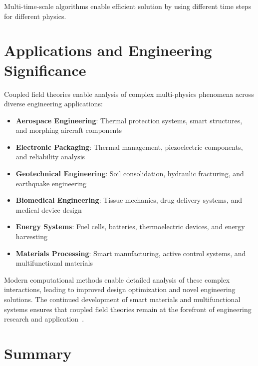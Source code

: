 Multi-time-scale algorithms enable efficient solution by using different time steps for different physics.

\section{Applications and Engineering Significance}

Coupled field theories enable analysis of complex multi-physics phenomena across diverse engineering applications:

\begin{itemize}
\item \textbf{Aerospace Engineering}: Thermal protection systems, smart structures, and morphing aircraft components
\item \textbf{Electronic Packaging}: Thermal management, piezoelectric components, and reliability analysis
\item \textbf{Geotechnical Engineering}: Soil consolidation, hydraulic fracturing, and earthquake engineering
\item \textbf{Biomedical Engineering}: Tissue mechanics, drug delivery systems, and medical device design
\item \textbf{Energy Systems}: Fuel cells, batteries, thermoelectric devices, and energy harvesting
\item \textbf{Materials Processing}: Smart manufacturing, active control systems, and multifunctional materials
\end{itemize}

Modern computational methods enable detailed analysis of these complex interactions, leading to improved design optimization and novel engineering solutions. The continued development of smart materials and multifunctional systems ensures that coupled field theories remain at the forefront of engineering research and application~\autocite{Sadd.2019}.

\section{Summary}

